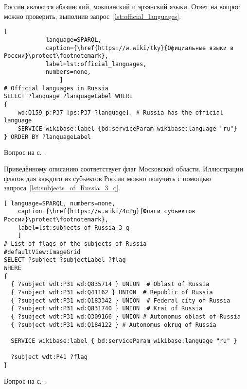 \begin{task}
\label{answer:official_language}
 \href{https://w.wiki/myt}{России} являются 
    \href{https://w.wiki/myv}{абазинский}, 
    \href{https://w.wiki/myx}{мокшанский} 
    и \href{https://w.wiki/myy}{эрзянский} языки. 
    Ответ на вопрос можно проверить, выполнив запрос~\ref{lst:official_languages}.
	
\begin{lstlisting}[ 
            language=SPARQL, 
            caption={\href{https://w.wiki/tky}{Официальные языки в России}\protect\footnotemark},
            label=lst:official_languages,
            numbers=none,
                ]
# Official languages in Russia
SELECT ?lanquage ?lanquageLabel WHERE
{ 
	wd:Q159 p:P37 [ps:P37 ?lanquage]. # Russia has the official language
	SERVICE wikibase:label {bd:serviceParam wikibase:language "ru"}
} ORDER BY ?lanquageLabel
\end{lstlisting}
	
\small{\AnswerBackref Вопрос на с.~\pageref{lst:List_of_historical_countries}.}
\end{task}





\hfil{}\hfil%

\begin{task}
\label{answer:subjects_of_Russia_3}
Приведённому описанию соответствует флаг Московской области. 
    Иллюстрации флагов для каждого из субъектов России 
    можно получить с помощью запроса~\ref{lst:subjects_of_Russia_3_q}.
	
	\begin{lstlisting}[ language=SPARQL, numbers=none,
	caption={\href{https://w.wiki/4cPg}{Флаги субъектов России}\protect\footnotemark},
	label=lst:subjects_of_Russia_3_q
	]
# List of flags of the subjects of Russia
#defaultView:ImageGrid
SELECT ?subject ?subjectLabel ?flag
WHERE
{
  { ?subject wdt:P31 wd:Q835714 } UNION  # Oblast of Russia
  { ?subject wdt:P31 wd:Q41162 } UNION  # Republic of Russia
  { ?subject wdt:P31 wd:Q183342 } UNION  # Federal city of Russia
  { ?subject wdt:P31 wd:Q831740 } UNION  # Krai of Russia
  { ?subject wdt:P31 wd:Q309166 } UNION # Autonomus oblast of Russia
  { ?subject wdt:P31 wd:Q184122 } # Autonomus okrug of Russia
  
  SERVICE wikibase:label { bd:serviceParam wikibase:language "ru" }
   
  ?subject wdt:P41 ?flag
}
\end{lstlisting}
	
\small{\AnswerBackref Вопрос на с.~\pageref{lst:oblast-of-Russia}.}
\end{task}



